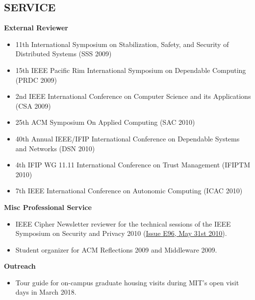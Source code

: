 \documentclass[line,margin]{res}
\begin{document}
\begin{resume}
 
\section{SERVICE}
	       \textbf{External Reviewer}
                \begin{itemize}  \itemsep -2pt	       
                \item 11th International Symposium on Stabilization, Safety, and Security of Distributed Systems (SSS 2009)
                \item15th IEEE Pacific Rim International Symposium on Dependable Computing (PRDC 2009)
                \item 2nd IEEE International Conference on Computer Science and its Applications (CSA 2009)
                \item 25th ACM Symposium On Applied Computing (SAC 2010)
                \item 40th Annual IEEE/IFIP International Conference on Dependable Systems and Networks (DSN 2010) 
                \item 4th IFIP WG 11.11 International Conference on Trust Management (IFIPTM 2010)
                \item 7th IEEE International Conference on Autonomic Computing (ICAC 2010)
                \end{itemize}
                \textbf{Misc Professional Service}
                \begin{itemize}  \itemsep -2pt
               \item IEEE Cipher Newsletter reviewer for the technical sessions of the IEEE Symposium on Security and Privacy 2010 (\href{http://www.ieee-security.org/Cipher/PastIssues/2010/E96.May-2010/E96.May-2010.html}{Issue E96, May 31st 2010}).
               \item Student organizer for ACM Reflections 2009 and Middleware 2009.
               \end{itemize}   
               \textbf{Outreach}
               \begin{itemize}  \itemsep -2pt
              \item Tour guide for on-campus graduate housing visits during MIT's open visit days in March 2018.

\end{itemize}
\end{resume}
\end{document}

